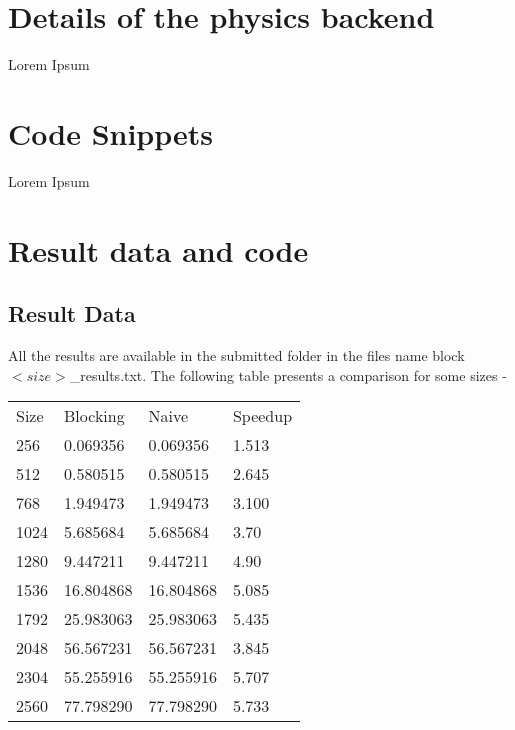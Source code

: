 \documentclass[a4paper]{article}
\begin{document}
\section*{Details of the physics backend}
Lorem Ipsum 

\section*{Code Snippets}
Lorem Ipsum 


\section{\color{db}Result data and code}
\subsection{\color{db}Result Data}
All the results are available in the submitted folder in the files name block$<size>$\_results.txt. The following table presents a comparison for some sizes - \\
\begin{tabular}{| l|l|l|l|}
Size & Blocking & Naive & Speedup \\ 
256  & 0.069356 & 0.069356 & 1.513   \\         
512  & 0.580515 & 0.580515 & 2.645  \\
768  & 1.949473 & 1.949473 & 3.100  \\
1024 &  5.685684 & 5.685684 &  3.70  \\
1280 &  9.447211 & 9.447211 &  4.90  \\ 
1536 &  16.804868 & 16.804868 &  5.085 \\
1792 &  25.983063 & 25.983063 & 5.435 \\
2048 &  56.567231 & 56.567231 & 3.845  \\
2304 &  55.255916 & 55.255916 & 5.707 \\
2560 &  77.798290 & 77.798290 & 5.733 \\

\end{tabular}
\clearpage
\end{document}
